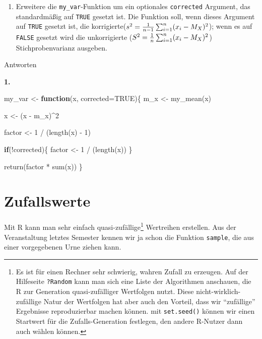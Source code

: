 \documentclass[
]{book}
\newenvironment{Shaded}{\begin{snugshade}}{\end{snugshade}}
\newcommand{\AttributeTok}[1]{\textcolor[rgb]{0.77,0.63,0.00}{#1}}
\newcommand{\ConstantTok}[1]{\textcolor[rgb]{0.00,0.00,0.00}{#1}}
\newcommand{\ControlFlowTok}[1]{\textcolor[rgb]{0.13,0.29,0.53}{\textbf{#1}}}
\newcommand{\DecValTok}[1]{\textcolor[rgb]{0.00,0.00,0.81}{#1}}
\newcommand{\FunctionTok}[1]{\textcolor[rgb]{0.00,0.00,0.00}{#1}}
\newcommand{\NormalTok}[1]{#1}
\newcommand{\OtherTok}[1]{\textcolor[rgb]{0.56,0.35,0.01}{#1}}
\newcommand{\SpecialCharTok}[1]{\textcolor[rgb]{0.00,0.00,0.00}{#1}}
\providecommand{\tightlist}{%
  \setlength{\itemsep}{0pt}\setlength{\parskip}{0pt}}
\begin{document}
\begin{enumerate}
\def\labelenumi{\arabic{enumi}.}
\tightlist
\item
  Erweitere die \texttt{my\_var}-Funktion um ein optionales \texttt{corrected} Argument, das standardmäßig auf \texttt{TRUE} gesetzt ist. Die Funktion soll, wenn dieses Argument auf \texttt{TRUE} gesetzt ist, die korrigierte(\(s^2 = {1\over{n-1}} \sum_{i=1}^n(x_i -M_X)^2\)); wenn es auf \texttt{FALSE} gesetzt wird die unkorrigierte (\(S^2 = {1\over{n}} \sum_{i=1}^n(x_i -M_X)^2\)) Stichprobenvarianz ausgeben.
\end{enumerate}

Antworten

\textbf{1.}

\begin{Shaded}
\begin{Highlighting}[]
\NormalTok{my\_var }\OtherTok{\textless{}{-}} \ControlFlowTok{function}\NormalTok{(x, }\AttributeTok{corrected=}\ConstantTok{TRUE}\NormalTok{)\{}
\NormalTok{  m\_x }\OtherTok{\textless{}{-}} \FunctionTok{my\_mean}\NormalTok{(x)}
  
\NormalTok{  x }\OtherTok{\textless{}{-}}\NormalTok{ (x }\SpecialCharTok{{-}}\NormalTok{ m\_x)}\SpecialCharTok{\^{}}\DecValTok{2}
  
\NormalTok{  factor }\OtherTok{\textless{}{-}} \DecValTok{1} \SpecialCharTok{/}\NormalTok{ (}\FunctionTok{length}\NormalTok{(x) }\SpecialCharTok{{-}} \DecValTok{1}\NormalTok{)}
  
  \ControlFlowTok{if}\NormalTok{(}\SpecialCharTok{!}\NormalTok{corrected)\{}
\NormalTok{    factor }\OtherTok{\textless{}{-}} \DecValTok{1} \SpecialCharTok{/}\NormalTok{ (}\FunctionTok{length}\NormalTok{(x))}
\NormalTok{  \}}
  
  \FunctionTok{return}\NormalTok{(factor }\SpecialCharTok{*} \FunctionTok{sum}\NormalTok{(x))}
\NormalTok{\}}
\end{Highlighting}
\end{Shaded}

\hypertarget{zufallswerte}{%
\section{Zufallswerte}\label{zufallswerte}}

Mit R kann man sehr einfach quasi-zufällige\footnote{Es ist für einen Rechner sehr schwierig, wahren Zufall zu erzeugen. Auf der Hilfeseite \texttt{?Random} kann man sich eine Liste der Algorithmen anschauen, die R zur Generation quasi-zufälliger Wertfolgen nutzt. Diese nicht-wirklich-zufällige Natur der Wertfolgen hat aber auch den Vorteil, dass wir ``zufällige'' Ergebnisse reproduzierbar machen können. mit \texttt{set.seed()} können wir einen Startwert für die Zufalls-Generation festlegen, den andere R-Nutzer dann auch wählen können.} Wertreihen erstellen. Aus der Veranstaltung letztes Semester kennen wir ja schon die Funktion \texttt{sample}, die aus einer vorgegebenen Urne ziehen kann.
\end{document}
